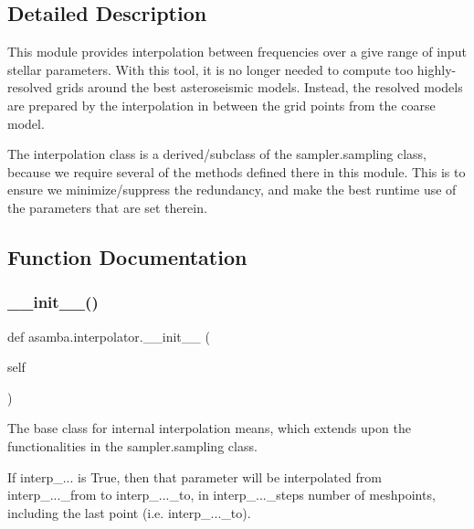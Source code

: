 \subsection{Detailed Description}
\begin{DoxyVerb}This module provides interpolation between frequencies over a give range of input 
stellar parameters. With this tool, it is no longer needed to compute too 
highly-resolved grids around the best asteroseismic models. Instead, the resolved 
models are prepared by the interpolation in between the grid points from the coarse model.

The interpolation class is a derived/subclass of the sampler.sampling class, because we require
several of the methods defined there in this module. This is to ensure we minimize/suppress 
the redundancy, and make the best runtime use of the parameters that are set therein.
\end{DoxyVerb}
 

\subsection{Function Documentation}
\mbox{\label{namespaceasamba_1_1interpolator_a9a806356bd8d8cdea81353f8d219a0a9}} 
\subsubsection{\texorpdfstring{\+\_\+\+\_\+init\+\_\+\+\_\+()}{\_\_init\_\_()}}
{\footnotesize\ttfamily def asamba.\+interpolator.\+\_\+\+\_\+init\+\_\+\+\_\+ (\begin{DoxyParamCaption}\item[{}]{self }\end{DoxyParamCaption})}

\begin{DoxyVerb}The base class for internal interpolation means, which extends upon the functionalities in the 
sampler.sampling class.

If interp_... is True, then that parameter will be interpolated
from interp_..._from to interp_..._to, in interp_..._steps number of 
meshpoints, including the last point (i.e. interp_..._to).
\end{DoxyVerb}
 

